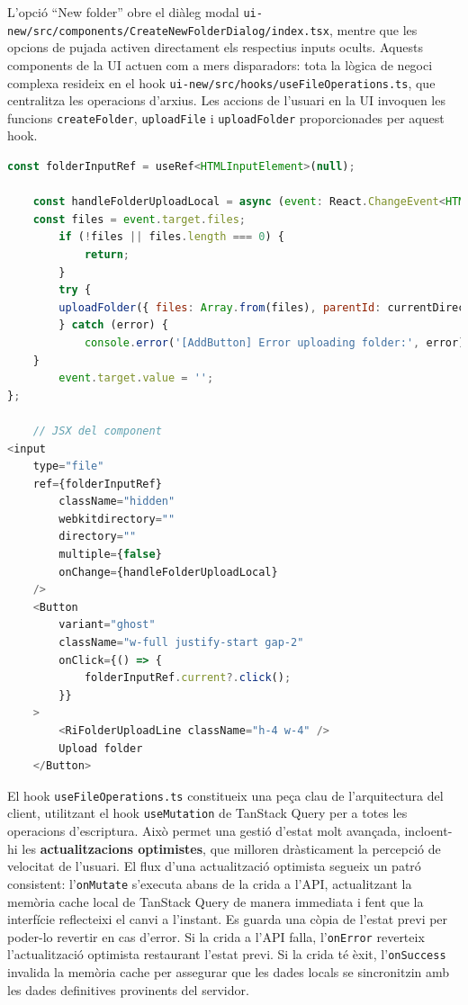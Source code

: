 L'opció ``New folder'' obre el diàleg modal \texttt{ui-new/src/components/CreateNewFolderDialog/index.tsx}, mentre que les opcions de pujada activen directament els respectius inputs ocults. Aquests components de la UI actuen com a mers disparadors: tota la lògica de negoci complexa resideix en el hook \texttt{ui-new/src/hooks/useFileOperations.ts}, que centralitza les operacions d'arxius. Les accions de l'usuari en la UI invoquen les funcions \texttt{createFolder}, \texttt{uploadFile} i \texttt{uploadFolder} proporcionades per aquest hook.

\begin{lstlisting}[language=javascript, caption={Activació de la pujada de carpetes a `AddButton/index.tsx`}]
const folderInputRef = useRef<HTMLInputElement>(null);
    
    const handleFolderUploadLocal = async (event: React.ChangeEvent<HTMLInputElement>) => {
    const files = event.target.files;
        if (!files || files.length === 0) {
            return;
        }
        try {
        uploadFolder({ files: Array.from(files), parentId: currentDirectory.id!.toString() });
        } catch (error) {
            console.error('[AddButton] Error uploading folder:', error);
    }
        event.target.value = '';
};
    
    // JSX del component
<input
    type="file"
    ref={folderInputRef}
        className="hidden"
        webkitdirectory=""
        directory=""
        multiple={false}
        onChange={handleFolderUploadLocal}
    />
    <Button
        variant="ghost"
        className="w-full justify-start gap-2"
        onClick={() => {
            folderInputRef.current?.click();
        }}
    >
        <RiFolderUploadLine className="h-4 w-4" />
        Upload folder
    </Button>
\end{lstlisting}

El hook \texttt{useFileOperations.ts} constitueix una peça clau de l'arquitectura del client, utilitzant el hook \texttt{useMutation} de TanStack Query per a totes les operacions d'escriptura. Això permet una gestió d'estat molt avançada, incloent-hi les \textbf{actualitzacions optimistes}, que milloren dràsticament la percepció de velocitat de l'usuari. El flux d'una actualització optimista segueix un patró consistent: l'\texttt{onMutate} s'executa abans de la crida a l'API, actualitzant la memòria cache local de TanStack Query de manera immediata i fent que la interfície reflecteixi el canvi a l'instant. Es guarda una còpia de l'estat previ per poder-lo revertir en cas d'error. Si la crida a l'API falla, l'\texttt{onError} reverteix l'actualització optimista restaurant l'estat previ. Si la crida té èxit, l'\texttt{onSuccess} invalida la memòria cache per assegurar que les dades locals se sincronitzin amb les dades definitives provinents del servidor.

